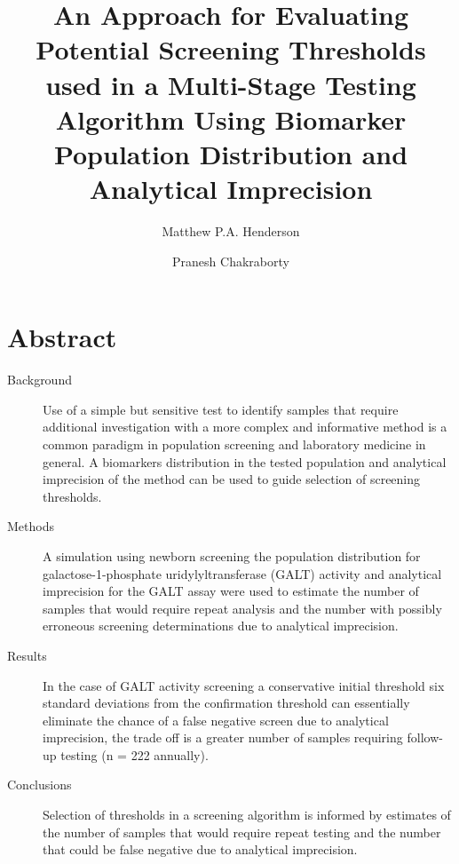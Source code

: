 \documentclass[review]{elsarticle}
\date{}
\title{}
\begin{document}
\makeatletter
\newcommand{\citeprocitem}[2]{\hyper@linkstart{cite}{citeproc_bib_item_#1}#2\hyper@linkend}
\makeatother



\newcommand{\beginsupplement}{%
        \setcounter{table}{0}
        \renewcommand{\thetable}{S\arabic{table}}%
        \setcounter{figure}{0}
        \renewcommand{\thefigure}{S\arabic{figure}}%
     }
\begin{frontmatter}
\title{An Approach for Evaluating Potential Screening Thresholds used in a Multi-Stage Testing Algorithm Using Biomarker Population Distribution and Analytical Imprecision}
\author[NSO, UoO]{Matthew P.A. Henderson}
\author[NSO, UO]{Pranesh Chakraborty}
\address[NSO]{Newborn Screening Ontario, Children's Hospital of Eastern Ontario, Ottawa, Canada}
\address[UoO]{Department of Medicine, University of Ottawa, Ottawa, Canada} 
\end{frontmatter}

\section*{Abstract}
\label{sec:org17c52af}
\begin{description}
\item[{Background}] Use of a simple but sensitive test to identify
samples that require additional investigation with a more complex
and informative method is a common paradigm in population screening
and laboratory medicine in general. A biomarkers distribution in the
tested population and analytical imprecision of the method can be
used to guide selection of screening thresholds.
\item[{Methods}] A simulation using newborn screening the population
distribution for galactose-1-phosphate uridylyltransferase (GALT)
activity and analytical imprecision for the GALT assay were used to
estimate the number of samples that would require repeat analysis
and the number with possibly erroneous screening determinations due
to analytical imprecision.
\item[{Results}] In the case of GALT activity screening a conservative
initial threshold six standard deviations from the confirmation
threshold can essentially eliminate the chance of a false negative
screen due to analytical imprecision, the trade off is a greater
number of samples requiring follow-up testing (n = 222 annually).
\item[{Conclusions}] Selection of thresholds in a screening algorithm is
informed by estimates of the number of samples that would require
repeat testing and the number that could be false negative due to
analytical imprecision.
\end{description}
\end{document}
